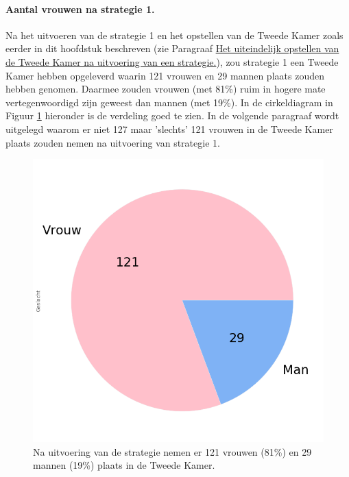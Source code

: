 \paragraph{Aantal vrouwen na strategie 1.}
Na het uitvoeren van de strategie 1 en het opstellen van de Tweede Kamer zoals eerder in dit hoofdstuk beschreven (zie Paragraaf \hyperref[opstellen]{Het uiteindelijk opstellen van de Tweede Kamer na uitvoering van een strategie.}), zou strategie 1 een Tweede Kamer hebben opgeleverd waarin 121 vrouwen en 29 mannen plaats zouden hebben genomen. Daarmee zouden vrouwen (met 81\%) ruim in hogere mate vertegenwoordigd zijn geweest dan mannen (met 19\%). In de cirkeldiagram in Figuur \ref{fig:pcS1V} hieronder is de verdeling goed te zien. In de volgende paragraaf wordt uitgelegd waarom er niet 127 maar 'slechts' 121 vrouwen in de Tweede Kamer plaats zouden nemen na uitvoering van strategie 1.

\begin{figure}[H]
\centering
	\includegraphics[width=0.35\linewidth]{pie_chart_topN.png}

			\caption{Na uitvoering van de strategie nemen er 121 vrouwen (81\%) en 29 mannen (19\%) plaats in de Tweede Kamer.}

\label{fig:pcS1V}
\end{figure}

\newpage
